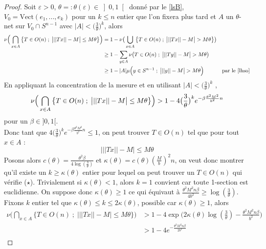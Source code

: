 \documentclass[12pt]{article}
\theoremstyle{definition}
\begin{document}
\begin{proof}
	Soit $\varepsilon>0$, $\theta=:\theta(\varepsilon)\in\left]0,1\right[$ donné par le \cref{lsB}, $V_0 = \text{Vect}(e_1,...,e_k)$ pour un $k\leq n$ entier que l'on fixera plus tard et $A$ un $\theta$-net sur $V_0\cap S^{n-1}$ avec $|A|< \big(\frac{3}{\theta}\big)^k$, alors 
	\begin{align*}
	\nu\Big(\bigcap_{x\in A}\big\{T\in O(n)\; ; \;  \big| ||Tx||-M \big|\leq M\theta\big\}\Big)& = 1-\nu\big(\bigcup_{x\in A}\big\{T\in O(n)\; ; \; \big| ||Tx||-M \big|>M\theta\big\}\big)& \\
	& \geq 1-\sum_{y\in A}\nu\big(T\in O(n)\; ; \; \big| ||Ty||-M \big|>M\theta\big)\\
	& \geq 1 - |A|\mu\Big(y\in S^{n-1}\; ;\; \big| ||y||-M \big|>M\theta\Big) & \text{par le \cref{lhso}}
	\end{align*} 
	En appliquant la concentration de la mesure et en utilisant $|A|< \big(\frac{3}{\theta}\big)^k$ ,
	\begin{equation*}
	\nu\Big(\bigcap_{x\in A}\big\{T\in O(n)\; ; \;  \big| ||Tx||-M \big|\leq M\theta\big\}\Big)> 1 - 4\big(\frac{3}{\theta}\big)^k e^{-\beta\frac{\theta^2M^2}{b^2}n}\\
	\end{equation*}
	pour un $\beta\in]0,1[$. \\
	Donc tant que $4\big(\frac{3}{\theta}\big)^k e^{-\beta\frac{\theta^2M^2}{b^2}n}\leq 1$, on peut trouver $T\in O(n)$ tel que pour tout $x\in A$ :
	\begin{equation*}\tag{$\star$}
	\Big| ||Tx||- M \Big|\leq M\theta
	\end{equation*}
	Posons alors $c(\theta)=\frac{\theta^2 \beta}{4\log\left(\frac{3}{\theta}\right)}$ et $\kappa(\theta)=c(\theta)\left(\frac{M}{b}\right)^2 n$, on veut donc montrer qu'il existe un $k\geq \kappa(\theta)$ entier pour lequel on peut trouver un $T\in O(n)$ qui vérifie ($\star$). Trivialement si $\kappa(\theta)<1$, alors $k=1$ convient car toute 1-section est euclidienne. On suppose donc $\kappa(\theta)\geq 1$ ce qui équivaut à $\frac{\theta^2M^2n\beta}{4b^2}\geq \log(\frac{3}{\theta})$. Fixons $k$ entier tel que $\kappa(\theta)\leq k\leq 2\kappa(\theta)$, possible car $\kappa(\theta)\geq 1$, alors
	\begin{align*}
	\nu\Big(\bigcap_{x\in A}\big\{T\in O(n)\; ; \;  \big| ||Tx||-M \big|\leq M\theta\big\}\Big)
	& > 1 - 4 \exp\big(2\kappa(\theta)\log(\frac{3}{\theta})-\frac{\theta^2M^2n\beta}{b^2}\big)\\
	& > 1 -  4 e^{-\frac{\theta^2M^2n\beta}{2b^2}}\\

\end{align*}
\end{proof}
\end{document}
